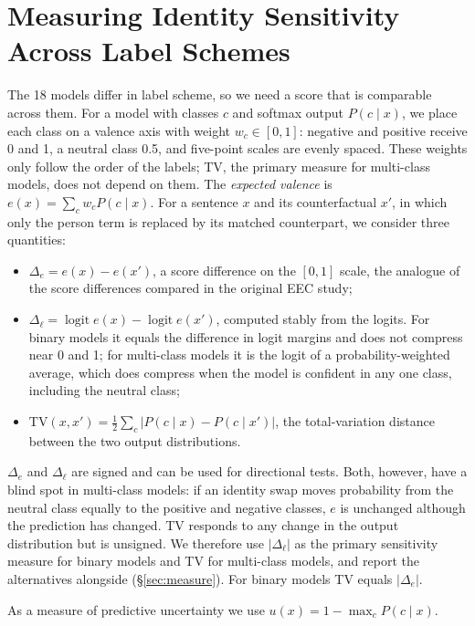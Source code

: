\documentclass[runningheads]{llncs}
\begin{document}
\section{Measuring Identity Sensitivity Across Label Schemes}\label{sec:measures}
The 18 models differ in label scheme, so we need a score that is comparable
across them. For a model with classes $c$ and softmax output $P(c\mid x)$, we
place each class on a valence axis with weight $w_c\in[0,1]$: negative and
positive receive 0 and 1, a neutral class 0.5, and five-point scales are evenly
spaced. These weights only follow the order of the labels; TV, the primary
measure for multi-class models, does not depend on them. The \emph{expected valence} is $e(x)=\sum_c w_c P(c\mid x)$. For a
sentence $x$ and its counterfactual $x'$, in which only the person term is
replaced by its matched counterpart, we consider three quantities:
\begin{itemize}
  \item $\Delta_e = e(x)-e(x')$, a score difference on the $[0,1]$ scale, the
  analogue of the score differences compared in the original EEC study;
  \item $\Delta_{\ell} = \operatorname{logit} e(x) - \operatorname{logit} e(x')$,
  computed stably from the logits. For binary models it equals the difference
  in logit margins and does not compress near 0 and 1; for multi-class models
  it is the logit of a probability-weighted average, which does compress when
  the model is confident in any one class, including the neutral class;
  \item $\mathrm{TV}(x,x') = \tfrac12 \sum_c |P(c\mid x) - P(c\mid x')|$, the
  total-variation distance between the two output distributions.
\end{itemize}
$\Delta_e$ and $\Delta_\ell$ are signed and can be used for directional tests.
Both, however, have a blind spot in multi-class models: if an identity swap
moves probability from the neutral class equally to the positive and negative
classes, $e$ is unchanged although the prediction has changed. TV responds to
any change in the output distribution but is unsigned. We therefore use
$|\Delta_\ell|$ as the primary sensitivity measure for binary models and TV for
multi-class models, and report the alternatives alongside (\S\ref{sec:measure}).
For binary models TV equals $|\Delta_e|$.

As a measure of predictive uncertainty we use $u(x) = 1-\max_c P(c\mid x)$.

\end{document}
